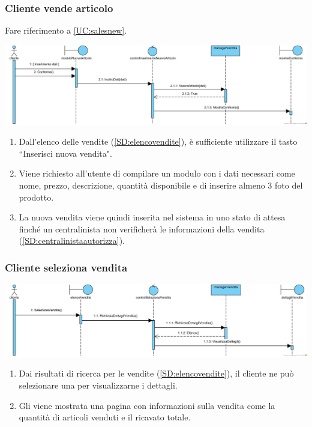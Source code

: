 \documentclass[12pt,a4paper]{article}
\begin{document}
\subsubsection{Cliente vende articolo}
\label{SD:creazionevendita}

Fare riferimento a \ref{UC:salesnew}. \\

\begin{center}
\includegraphics[width=\textwidth]{SequenceDiagram/ClienteVenditaCrea}
\end{center}

\begin{enumerate}
\item Dall'elenco delle vendite (\ref{SD:elencovendite}), è sufficiente utilizzare il tasto ``Inserisci nuova vendita".
\item Viene richiesto all'utente di compilare un modulo con i dati necessari come nome, prezzo, descrizione, quantità disponibile e di inserire almeno 3 foto del prodotto.
\item La nuova vendita viene quindi inserita nel sistema in uno stato di attesa finché un centralinista non verificherà le informazioni della vendita (\ref{SD:centralinistaautorizza}).
\end{enumerate}

\subsubsection{Cliente seleziona vendita}
\label{SD:selezionavenditacliente}

\begin{center}
\includegraphics[width=\textwidth]{SequenceDiagram/ClienteVenditaSeleziona}
\end{center}

\begin{enumerate}
\item Dai risultati di ricerca per le vendite (\ref{SD:elencovendite}), il cliente ne può selezionare una per visualizzarne i dettagli.
\item Gli viene mostrata una pagina con informazioni sulla vendita come la quantità di articoli venduti e il ricavato totale.
\end{enumerate}
\end{document}

